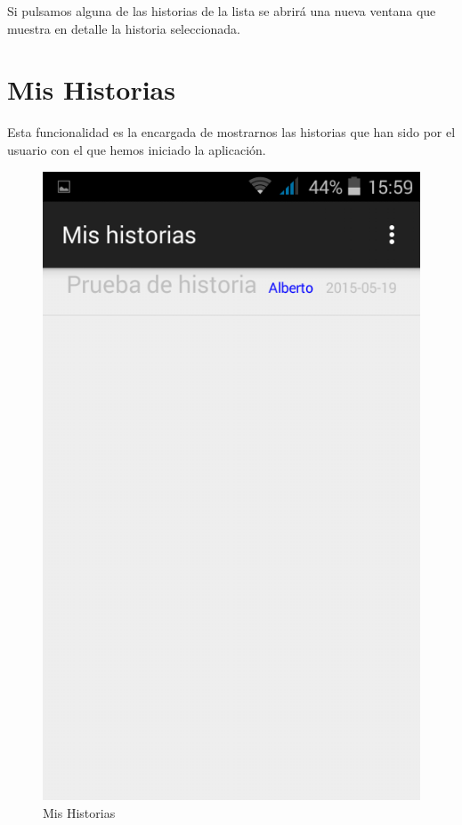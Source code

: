\documentclass[11pt,a4paper, titlepage]{article}
\begin{document}
	Si pulsamos alguna de las historias de la lista se abrirá una nueva ventana que muestra en detalle la historia seleccionada.
	
	\FloatBarrier
	\section[Mis Historias]{Mis Historias}
	Esta funcionalidad es la encargada de mostrarnos las historias que han sido por el usuario con el que hemos iniciado la aplicación.
	
	\begin{figure}[hbtp]
		\centering
		\includegraphics[scale = 0.25 ]{img/5}
		\caption{Mis Historias}
		\label{p12}
	\end{figure}
	
\end{document}
